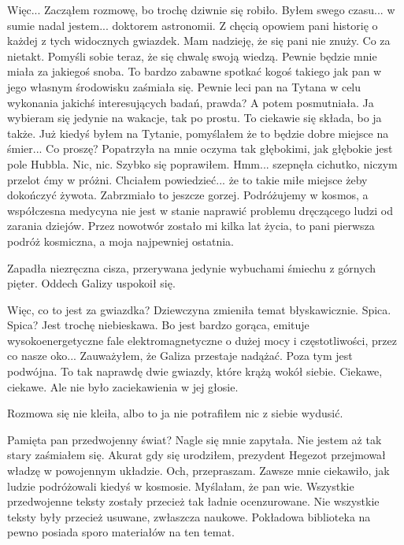 \begin{dialogue}
	\ds{} Więc... \dm{} Zacząłem rozmowę, bo trochę dziwnie się robiło. \dm{} Byłem swego czasu... w sumie nadal jestem... doktorem astronomii.
		Z chęcią opowiem pani historię o każdej z tych widocznych gwiazdek. Mam nadzieję, że się pani nie znuży. \dm{} Co za nietakt. Pomyśli sobie teraz, że się chwalę swoją wiedzą.
		Pewnie będzie mnie miała za jakiegoś snoba.
	\ds{} To bardzo zabawne spotkać kogoś takiego jak pan w jego własnym środowisku \dm{} zaśmiała się. \dm{}
		 Pewnie leci pan na Tytana w celu wykonania jakichś interesujących badań, prawda? \dm{} A potem posmutniała. \dm{} Ja wybieram się jedynie na wakacje, tak po prostu.
	\ds{} To ciekawie się składa, bo ja także. Już kiedyś byłem na Tytanie, pomyślałem że to będzie dobre miejsce na śmier...
	\ds{} Co proszę? \dm{} Popatrzyła na mnie oczyma tak głębokimi, jak głębokie jest pole Hubbla.
	\ds{} Nic, nic. \dm{} Szybko się poprawiłem.
	\ds{} Hmm... \dm{} szepnęła cichutko, niczym przelot ćmy w próżni.
	\ds{} Chciałem powiedzieć... że to takie miłe miejsce żeby dokończyć żywota. \dm{} Zabrzmiało to jeszcze gorzej. 
		\dm{} Podróżujemy w kosmos, a współczesna medycyna nie jest w stanie naprawić problemu dręczącego ludzi od zarania dziejów. 
		Przez nowotwór zostało mi kilka lat życia, to pani pierwsza podróż kosmiczna, a moja najpewniej ostatnia.
\end{dialogue}

Zapadła niezręczna cisza, przerywana jedynie wybuchami śmiechu z górnych pięter.
Oddech Galizy uspokoił się.

\begin{dialogue}
	\ds{} Więc, co to jest za gwiazdka? \dm{} Dziewczyna zmieniła temat błyskawicznie. 
	\ds{} Spica. 
	\ds{} Spica? Jest trochę niebieskawa.
	\ds{} Bo jest bardzo gorąca, emituje wysokoenergetyczne fale elektromagnetyczne o dużej mocy i częstotliwości, przez co nasze oko... \dm{} Zauważyłem, że Galiza przestaje nadążać.
		\dm{} Poza tym jest podwójna. To tak naprawdę dwie gwiazdy, które krążą wokół siebie.
	\ds{} Ciekawe, ciekawe. \dm{} Ale nie było zaciekawienia w jej głosie.
\end{dialogue}

Rozmowa się nie kleiła, albo to ja nie potrafiłem nic z siebie wydusić.

\begin{dialogue}
	\ds{} Pamięta pan przedwojenny świat? \dm{} Nagle się mnie zapytała. 
	\ds{} Nie jestem aż tak stary \dm{} zaśmiałem się. \dm{} Akurat gdy się urodziłem, prezydent Hegezot przejmował władzę w powojennym układzie.
	\ds{} Och, przepraszam. Zawsze mnie ciekawiło, jak ludzie podróżowali kiedyś w kosmosie. Myślałam, że pan wie. Wszystkie przedwojenne teksty zostały przecież tak ładnie ocenzurowane.
	\ds{} Nie wszystkie teksty były przecież usuwane, zwłaszcza naukowe. Pokładowa biblioteka na pewno posiada sporo materiałów na ten temat.
\end{dialogue}

